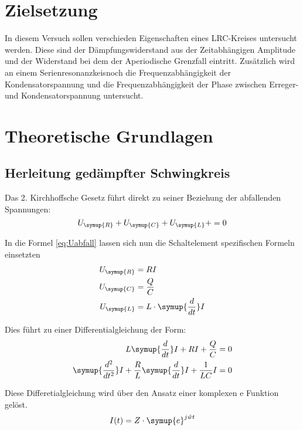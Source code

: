 \section{Zielsetzung}
    In diesem Versuch sollen verschieden Eigenschaften eines LRC-Kreises untersucht werden. Diese sind der Dämpfungswiderstand aus der 
    Zeitabhängigen Amplitude und der Widerstand bei dem der Aperiodische Grenzfall eintritt. Zusätzlich wird an einem 
    Serienresonanzkeisnoch die Frequenzabhängigkeit der Kondensatorspannung und die Frequenzabhängigkeit der Phase zwischen Erreger- und 
    Kondensatorspannung untersucht.

\section{Theoretische Grundlagen}

    \subsection{Herleitung gedämpfter Schwingkreis}

    Das 2. Kirchhoffsche Gesetz führt direkt zu seiner Beziehung der abfallenden Spannungen:
    \begin{equation}
    U_{\symup{R}} + U_{\symup{C}} + U_{\symup{L}} +  = 0     
    \label{eq:Uabfall}
    \end{equation}

    \noindent In die Formel \ref{eq:Uabfall} lassen sich nun die Schaltelement spezifischen Formeln  einsetzten
    \begin{align}
        U_{\symup{R}} & = RI \nonumber\\
        U_{\symup{C}} & = \frac{Q}{C}\nonumber\\
        U_{\symup{L}} & = L \cdot \symup{\frac{d}{dt}}I \nonumber
    \end{align}

    \noindent Dies führt zu einer Differentialgleichung der Form:
    \begin{align}
        L  \symup{\frac{d}{dt}}I + RI + \frac{Q}{C} & = 0 \nonumber\\
        \symup{\frac{d^2}{dt^2}}I + \frac{R}{L} \symup{\frac{d}{dt}}I + \frac{1}{LC}I & = 0 
        \label{eq:DGL1}
    \end{align}
    
    \noindent Diese Differetialgleichung wird über den Ansatz einer komplexen e Funktion gelöst.
    \begin{equation}
        I(t) = Z \cdot \symup{e}^{j \tilde{w} t}
        \label{eq:eAn}
    \end{equation}


